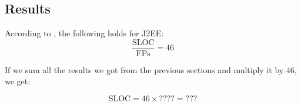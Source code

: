 \subsection{Results} %
\label{sub:results}
According to \cite{bib:fp}, the following holds for J2EE:
\begin{equation*}
    \frac{\mbox{SLOC}}{\mbox{FPs}} = 46
\end{equation*}

If we sum all the results we got from the previous sections and multiply it by 46, we get:

\begin{equation*}
     \mbox{SLOC} = 46 \times ???? = ???
 \end{equation*} 
